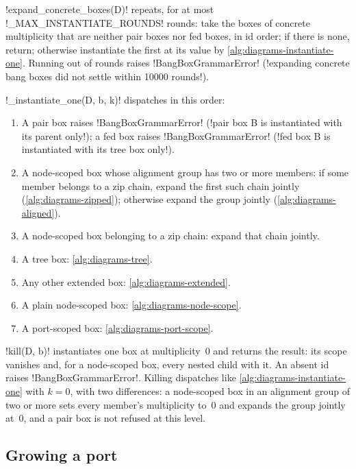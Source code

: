 \py!expand_concrete_boxes(D)! repeats, for at most \py!_MAX_INSTANTIATE_ROUNDS! rounds: take the boxes of concrete multiplicity that are neither pair boxes nor fed boxes, in id order; if there is none, return; otherwise instantiate the first at its value by \cref{alg:diagrams-instantiate-one}. Running out of rounds raises \py!BangBoxGrammarError! (\code!expanding concrete bang boxes did not settle within 10000 rounds!).

\begin{algorithm}\label{alg:diagrams-instantiate-one}
\py!_instantiate_one(D, b, k)! dispatches in this order:
\begin{enumerate}
\item A pair box raises \py!BangBoxGrammarError! (\code!pair box B is instantiated with its parent only!); a fed box raises \py!BangBoxGrammarError! (\code!fed box B is instantiated with its tree box only!).
\item A node-scoped box whose alignment group has two or more members: if some member belongs to a zip chain, expand the first such chain jointly (\cref{alg:diagrams-zipped}); otherwise expand the group jointly (\cref{alg:diagrams-aligned}).
\item A node-scoped box belonging to a zip chain: expand that chain jointly.
\item A tree box: \cref{alg:diagrams-tree}.
\item Any other extended box: \cref{alg:diagrams-extended}.
\item A plain node-scoped box: \cref{alg:diagrams-node-scope}.
\item A port-scoped box: \cref{alg:diagrams-port-scope}.
\end{enumerate}
\end{algorithm}

\py!kill(D, b)! instantiates one box at multiplicity~$0$ and returns the result: its scope vanishes and, for a node-scoped box, every nested child with it. An absent id raises \py!BangBoxGrammarError!. Killing dispatches like \cref{alg:diagrams-instantiate-one} with $k=0$, with two differences: a node-scoped box in an alignment group of two or more sets every member's multiplicity to~$0$ and expands the group jointly at~$0$, and a pair box is not refused at this level.

\subsection{Growing a port}\label{sec:diagrams-grow}

